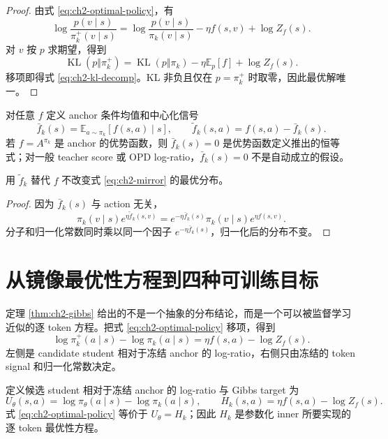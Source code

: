 \begin{proof}
由式 \eqref{eq:ch2-optimal-policy}，有
\[
\log\frac{p(v\mid s)}{\pi_k^+(v\mid s)}
=\log\frac{p(v\mid s)}{\pi_k(v\mid s)}-\eta f(s,v)+\log Z_f(s).
\]
对 $v$ 按 $p$ 求期望，得到
\[
\operatorname{KL}(p\Vert\pi_k^+)
=\operatorname{KL}(p\Vert\pi_k)-\eta\mathbb E_p[f]+\log Z_f(s).
\]
移项即得式 \eqref{eq:ch2-kl-decomp}。KL 非负且仅在 $p=\pi_k^+$ 时取零，因此最优解唯一。
\end{proof}

\begin{definition}
\label{def:ch2-centered-signal}
对任意 $f$ 定义 anchor 条件均值和中心化信号
\[
\bar f_k(s)=\mathbb E_{a\sim\pi_k}[f(s,a)\mid s],
\qquad
\widetilde f_k(s,a)=f(s,a)-\bar f_k(s).
\]
若 $f=A^{\pi_k}$ 是 anchor 的优势函数，则 $\bar f_k(s)=0$ 是优势函数定义推出的恒等式；对一般 teacher score 或 OPD log-ratio，$\bar f_k(s)=0$ 不是自动成立的假设。
\end{definition}

\begin{proposition}
\label{prop:ch2-centering}
用 $\widetilde f_k$ 替代 $f$ 不改变式 \eqref{eq:ch2-mirror} 的最优分布。
\end{proposition}

\begin{proof}
因为 $\bar f_k(s)$ 与 action 无关，
\[
\pi_k(v\mid s)e^{\eta\widetilde f_k(s,v)}
=e^{-\eta\bar f_k(s)}\pi_k(v\mid s)e^{\eta f(s,v)}.
\]
分子和归一化常数同时乘以同一个因子 $e^{-\eta\bar f_k(s)}$，归一化后的分布不变。
\end{proof}

\section{从镜像最优性方程到四种可训练目标}
\label{sec:ch2-objective-derivation}

定理 \ref{thm:ch2-gibbs} 给出的不是一个抽象的分布结论，而是一个可以被监督学习近似的逐 token 方程。把式 \eqref{eq:ch2-optimal-policy} 移项，得到
\begin{equation}
\label{eq:ch2-logratio-equation}
\log\pi_k^+(a\mid s)-\log\pi_k(a\mid s)
=\eta f(s,a)-\log Z_f(s).
\end{equation}
左侧是 candidate student 相对于冻结 anchor 的 log-ratio，右侧只由冻结的 token signal 和归一化常数决定。

\begin{definition}
\label{def:ch2-logratio-target}
定义候选 student 相对于冻结 anchor 的 log-ratio 与 Gibbs target 为
\[
U_\theta(s,a)=\log\pi_\theta(a\mid s)-\log\pi_k(a\mid s),
\qquad
H_k(s,a)=\eta f(s,a)-\log Z_f(s).
\]
式 \eqref{eq:ch2-optimal-policy} 等价于 $U_\theta=H_k$；因此 $H_k$ 是参数化 inner 所要实现的逐 token 最优性方程。
\end{definition}

